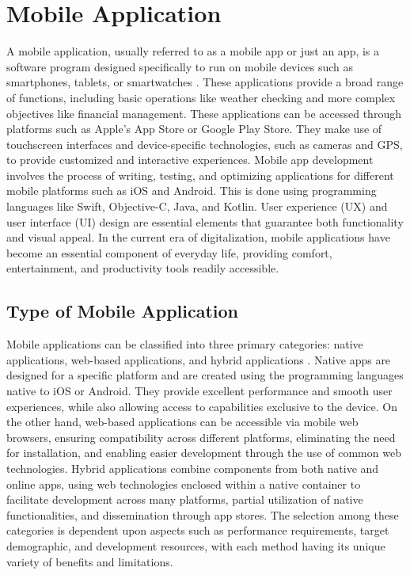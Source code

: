 \section{Mobile Application}
A mobile application, usually referred to as a mobile app or just an app, is a software program designed specifically to run on mobile devices such as smartphones, tablets, or smartwatches \parencite{ramdurai21}. These applications provide a broad range of functions, including basic operations like weather checking and more complex objectives like financial management. These applications can be accessed through platforms such as Apple's App Store or Google Play Store. They make use of touchscreen interfaces and device-specific technologies, such as cameras and GPS, to provide customized and interactive experiences. Mobile app development involves the process of writing, testing, and optimizing applications for different mobile platforms such as iOS and Android. This is done using programming languages like Swift, Objective-C, Java, and Kotlin. User experience (UX) and user interface (UI) design are essential elements that guarantee both functionality and visual appeal. In the current era of digitalization, mobile applications have become an essential component of everyday life, providing comfort, entertainment, and productivity tools readily accessible.

\subsection{Type of Mobile Application}
Mobile applications can be classified into three primary categories: native applications, web-based applications, and hybrid applications \parencite{syeed21}. Native apps are designed for a specific platform and are created using the programming languages native to iOS or Android. They provide excellent performance and smooth user experiences, while also allowing access to capabilities exclusive to the device. On the other hand, web-based applications can be accessible via mobile web browsers, ensuring compatibility across different platforms, eliminating the need for installation, and enabling easier development through the use of common web technologies. Hybrid applications combine components from both native and online apps, using web technologies enclosed within a native container to facilitate development across many platforms, partial utilization of native functionalities, and dissemination through app stores. The selection among these categories is dependent upon aspects such as performance requirements, target demographic, and development resources, with each method having its unique variety of benefits and limitations.

